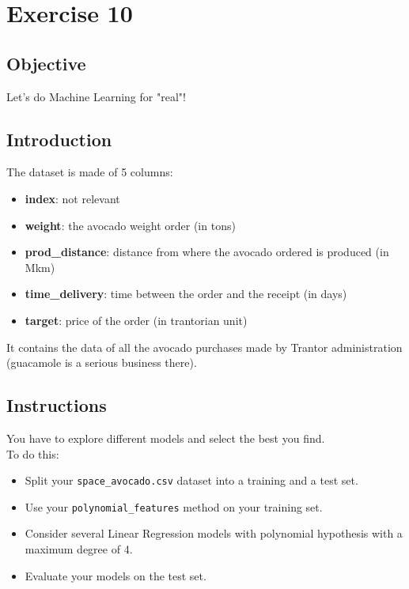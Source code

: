 \chapter{Exercise 10}
\makeheaderfilesforbidden

\section*{Objective}
Let's do Machine Learning for "real"!

\section*{Introduction}
The dataset is made of 5 columns:
\begin{itemize}
  \item \textbf{index}: not relevant
  \item \textbf{weight}: the avocado weight order (in tons)
  \item \textbf{prod\_distance}: distance from where the avocado ordered is produced (in Mkm)
  \item \textbf{time\_delivery}: time between the order and the receipt (in days)
  \item \textbf{target}: price of the order (in trantorian unit)
\end{itemize}
It contains the data of all the avocado purchases made by Trantor administration (guacamole is a serious business there).
\newpage
\section*{Instructions}
You have to explore different models and select the best you find.\\
\newline
To do this:
\begin{itemize}
  \item Split your \texttt{space\_avocado.csv} dataset into a training and a test set.
  \item Use your \texttt{polynomial\_features} method on your training set.
  \item Consider several Linear Regression models with polynomial hypothesis with a maximum degree of 4.
  \item Evaluate your models on the test set.
\end{itemize}

